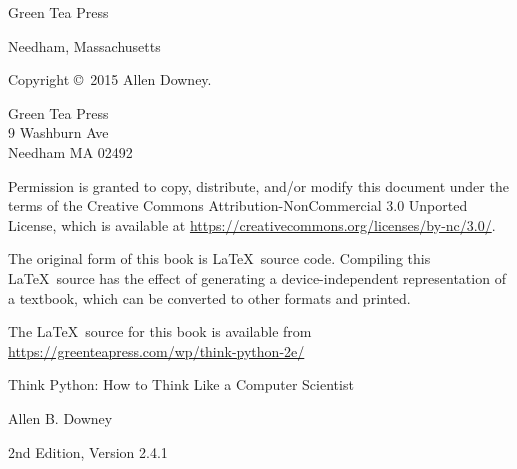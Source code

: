 \documentclass[10pt]{book}
\newcommand{\thetitle}{Think Python: How to Think Like a Computer Scientist}
\newcommand{\theversion}{2nd Edition, Version 2.4.1}
\newcommand{\thedate}{}
\begin{document}
\begin{latexonly}
\begin{flushright}
\vspace{0.5in}

{\Large Green Tea Press}

{\small Needham, Massachusetts}

\vfill

\end{flushright}


\pagebreak
\thispagestyle{empty}

{\small
Copyright \copyright ~2015 Allen Downey.


\vspace{0.2in}

\begin{flushleft}
Green Tea Press       \\
9 Washburn Ave        \\
Needham MA 02492
\end{flushleft}

Permission is granted to copy, distribute, and/or modify this document
under the terms of the Creative Commons Attribution-NonCommercial 3.0 Unported
License, which is available at \url{https://creativecommons.org/licenses/by-nc/3.0/}.

The original form of this book is \LaTeX\ source code.  Compiling this
\LaTeX\ source has the effect of generating a device-independent
representation of a textbook, which can be converted to other formats
and printed.

The \LaTeX\ source for this book is available from
\url{https://greenteapress.com/wp/think-python-2e/}

\vspace{0.2in}

} %

\end{latexonly}



\begin{htmlonly}


{\Large \thetitle}

{\large Allen B. Downey}

\theversion

\thedate

\setcounter{chapter}{-1}

\end{htmlonly}

\fi
\end{document}
